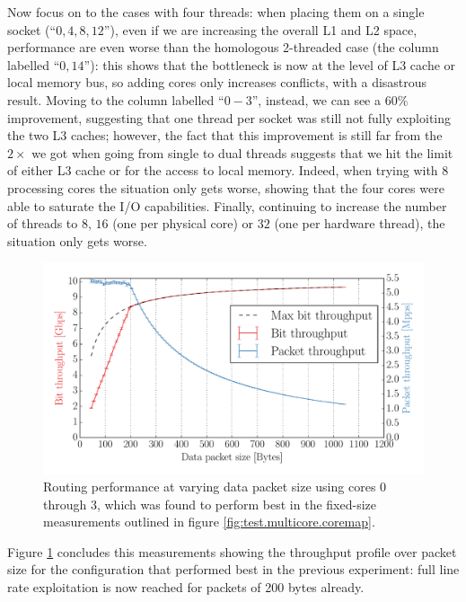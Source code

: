 \documentclass[11pt,a4paper,twoside,titlepage,openany]{book}
\begin{document}
Now focus on to the cases with four threads: when placing them on a single socket (``$0,4,8,12$''), even if we are increasing the overall L1 and L2 space, performance are even worse than the homologous 2-threaded case (the column labelled ``$0,14$''): this shows that the bottleneck is now at the level of L3 cache or local memory bus, so adding cores only increases conflicts, with a disastrous result. Moving to the column labelled ``$0-3$'', instead, we can see a $60\%$ improvement, suggesting that one thread per socket was still not fully exploiting the two L3 caches; however, the fact that this improvement is still far from the $2\times$ we got when going from single to dual threads suggests that we hit the limit of either L3 cache or for the access to local memory. Indeed, when trying with 8 processing cores the situation only gets worse, showing that the four cores were able to saturate the I/O capabilities. Finally, continuing to increase the number of threads to $8$, $16$ (one per physical core) or $32$ (one per hardware thread), the situation only gets worse.

\begin{figure}[tb]
  \begin{center}
    \includegraphics[width=1.0\textwidth]{img/augustus_increasing_len_0xF.pdf}
    \caption[Routing performance at varying data packet for the best multithread configuration.]{Routing performance at varying data packet size using cores 0 through 3, which was found to perform best in the fixed-size measurements outlined in figure \ref{fig:test.multicore.coremap}.}
    \label{fig:test.multicore.incr_len}
  \end{center}
\end{figure}

Figure \ref{fig:test.multicore.incr_len} concludes this measurements showing the throughput profile over packet size for the configuration that performed best in the previous experiment: full line rate exploitation is now reached for packets of 200 bytes already.
\end{document}
